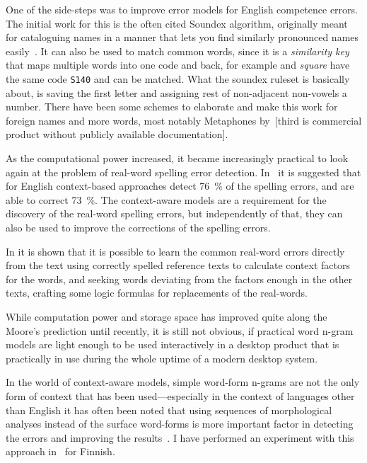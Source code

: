 \documentclass[officiallayout]{unihelcompling}
\newcommand\misspelt{\bgroup\markoverwith
{\textcolor{red}{\lower3.5pt\hbox{\sixly \char58}}}\ULon}
\begin{document}
One of the side-steps was to improve error models for English competence
errors. The initial work for this is the often cited Soundex algorithm,
originally meant for cataloguing names in a manner that lets you find similarly
pronounced names easily~\citep{russell1918soundex}. It can also be used to
match common words, since it is a \emph{similarity key} that maps multiple
words into one code and back, for example \misspelt{squer} and \emph{square}
have the same code \texttt{S140} and can be matched. What the soundex ruleset
is basically about, is saving the first letter and assigning rest of
non-adjacent non-vowels a number. There have been some schemes to elaborate and
make this work for foreign names and more words, most notably Metaphones 
by~\citet{philips1990hanging,philips2000double}[third is commercial product
without publicly available documentation].

As the computational power increased, it became increasingly practical to look
again at the problem of real-word spelling error detection.
In~\citet{mays1991context} it is suggested that for English context-based
approaches detect 76~\% of the spelling errors, and are able to correct 73~\%.
The context-aware models are a requirement for the discovery of the real-word
spelling errors, but independently of that, they can also be used to improve
the corrections of the spelling errors. 

In \citet{al2006learning} it is shown that it is possible to learn the common
real-word errors directly from the text using correctly spelled reference texts
to calculate context factors for the words, and seeking words deviating from
the factors enough in the other texts, crafting some logic formulas for
replacements of the real-words.

While computation power and storage space has improved quite along the Moore's
prediction until recently, it is still not obvious, if practical word n-gram
models are light enough to be used interactively in a desktop product that is
practically in use during the whole uptime of a modern desktop system.

In the world of context-aware models, simple word-form n-grams are not the only
form of context that has been used---especially in the context of languages
other than English it has often been noted that using sequences of
morphological analyses instead of the surface word-forms is more important
factor in detecting the errors and improving the results~\citep[for
Spanish]{otero2007contextual}. I have performed an experiment with this
approach in~ for Finnish.
\end{document}
